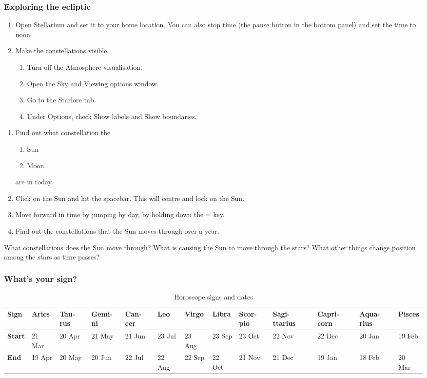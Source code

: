 \documentclass[main.tex]{subfiles}
\begin{document}
\subsubsection{Exploring the ecliptic}
\begin{enumerate}
\item Open Stellarium and set it to your home location. You can also stop time (the pause button in the bottom panel) and set the time to noon.
\item Make the constellations visible.
	\begin{enumerate}
	\item Turn off the Atmosphere visualisation.
	\item Open the Sky and Viewing options window.
	\item Go to the Starlore tab.
	\item Under Options, check Show labels and Show boundaries.
	\end{enumerate}
\end{enumerate}
\begin{enumerate}
\item Find out what constellation the
	\begin{enumerate}
	\item Sun
	\item Moon
	\end{enumerate}
are in today.
\item Click on the Sun and hit the spacebar. This will centre and lock on the Sun.
\item Move forward in time by jumping by day, by holding down the = key.
\item Find out the constellations that the Sun moves through over a year.
\end{enumerate}
What constellations does the Sun move through? What is causing the Sun to move through the stars? What other things change position among the stars as time passes?

\subsubsection{What's your sign?}
\begin{table}[htbp]
\caption{Horoscope signs and dates}
\begin{center}
\begin{tabular}{|p{1cm}|p{1cm}|p{1cm}|p{1cm}|p{1cm}|p{1cm}|p{1cm}|p{1cm}|p{1cm}|p{1cm}|p{1cm}|p{1cm}|p{1cm}|}\hline
\textbf{Sign} & Aries & Tau-rus & Gemi-ni & Can-cer & Leo & Virgo & Libra & Scor-pio & Sagi-ttarius & Capri-corn & Aqua-rius& Pisces \\\hline
\textbf{Start} & 21 Mar & 20 Apr & 21 May & 21 Jun & 23 Jul & 23 Aug & 23 Sep & 23 Oct & 22 Nov & 22 Dec & 20 Jan & 19 Feb \\\hline
\textbf{End} & 19 Apr & 20 May & 20 Jun & 22 Jul & 22 Aug & 22 Sep & 22 Oct & 21 Nov & 21 Dec & 19 Jan & 18 Feb & 20 Mar\\\hline
\end{tabular}
\end{center}
\label{tab:horo}
\end{table}
\end{document}

